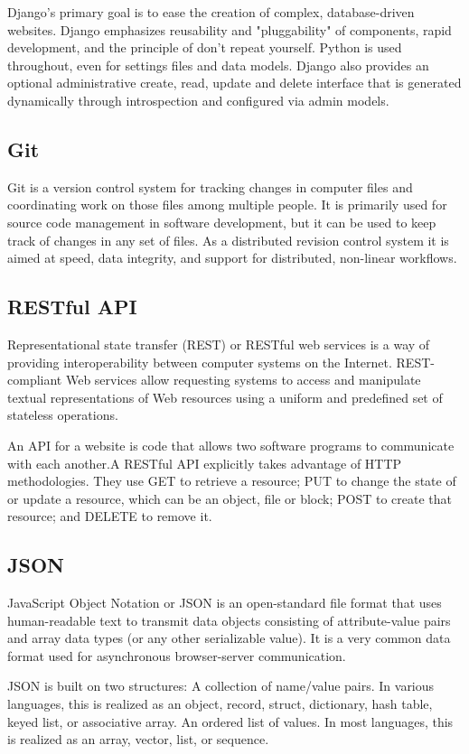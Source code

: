 \documentclass[BTech]{srmuthesis}
\begin{document}
Django's primary goal is to ease the creation of complex, database-driven websites. Django emphasizes reusability and "pluggability" of components, rapid development, and the principle of don't repeat yourself. Python is used throughout, even for settings files and data models. Django also provides an optional administrative create, read, update and delete interface that is generated dynamically through introspection and configured via admin models.
\subsection{Git}
Git is a version control system for tracking changes in computer files and coordinating work on those files among multiple people. It is primarily used for source code management in software development, but it can be used to keep track of changes in any set of files. As a distributed revision control system it is aimed at speed, data integrity, and support for distributed, non-linear workflows.
\subsection{RESTful \ac{API}}
Representational state transfer (REST) or RESTful web services is a way of providing interoperability between computer systems on the Internet. REST-compliant Web services allow requesting systems to access and manipulate textual representations of Web resources using a uniform and predefined set of stateless operations.

An \ac{API} for a website is code that allows two software programs to communicate with each another.A RESTful \ac{API} explicitly takes advantage of HTTP methodologies. They use GET to retrieve a resource; PUT to change the state of or update a resource, which can be an object, file or block; POST to create that resource; and DELETE to remove it.
\subsection{JSON}
JavaScript Object Notation or JSON is an open-standard file format that uses human-readable text to transmit data objects consisting of attribute-value pairs and array data types (or any other serializable value). It is a very common data format used for asynchronous browser-server communication.

JSON is built on two structures:
A collection of name/value pairs. In various languages, this is realized as an object, record, struct, dictionary, hash table, keyed list, or associative array.
An ordered list of values. In most languages, this is realized as an array, vector, list, or sequence.
\end{document}
